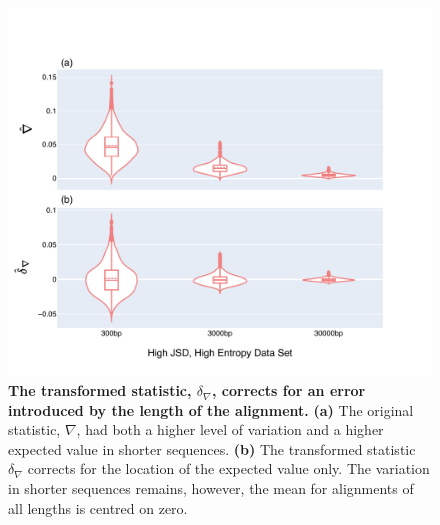\begin{figure}[!ht]
\centering
\includegraphics[width=\textwidth]{figures/plots/synthetic/d-conv-vs-conv/High JSD, High Entropy.pdf}
\caption{\textbf{The transformed statistic, $\delta_\nabla$, corrects for an error introduced by the length of the alignment.} \textbf{(a)} The original statistic, $\nabla$, had both a higher level of variation and a higher expected value in shorter sequences. \textbf{(b)} The transformed statistic $\delta_\nabla$ corrects for the location of the expected value only. The variation in shorter sequences remains, however, the mean for alignments of all lengths is centred on zero.}
\label{fig:synthetic/d-conv-vs-conv/HighJSDHighEntropy}
\end{figure}